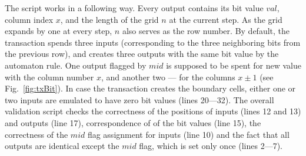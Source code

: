 The script works in a following way. Every output contains its bit value $val$,
column index $x$, and the length of the grid $n$ at the current step. As the
grid expands by one at every step, $n$ also serves as the row number. By
default, the transaction spends three inputs (corresponding to the three
neighboring bits from the previous row), and creates three outputs with the same
bit value by the automaton rule. One output flagged by $mid$ is supposed to be
spent for new value with the column number $x$, and another two --- for the
columns $x\pm 1$ (see Fig.~\ref{fig:txBit}). In case the transaction creates the
boundary cells, either one or two inputs are emulated to have zero bit values
(lines 20---32).  The overall validation script checks the correctness of the
positions of inputs (lines 12 and 13) and outputs (line 17), correspondence of
of the bit values (line 15), the correctness of the $mid$  flag assignment for
inputs (line 10) and the fact that all outputs are identical except the $mid$
flag, which is set only once (lines 2---7).
